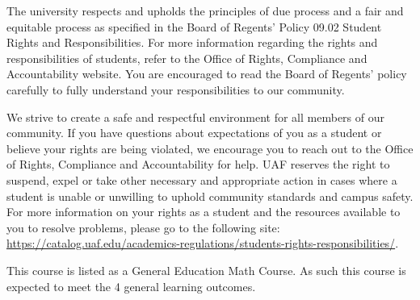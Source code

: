 \documentclass[12pt]{article}
\begin{document}




 The university respects and upholds the principles of due process and a fair and equitable process as specified in the Board of Regents’ Policy 09.02 Student Rights and Responsibilities. For more information regarding the rights and responsibilities of students, refer to the Office of Rights, Compliance and Accountability website. You are encouraged to read the Board of Regents’ policy carefully to fully understand your responsibilities to our community.

We strive to create a safe and respectful environment for all members of our community. If you have questions about expectations of you as a student or believe your rights are being violated, we encourage you to reach out to the  Office of Rights, Compliance and Accountability for help. UAF reserves the right to suspend, expel or take other necessary and appropriate action in cases where a student is unable or unwilling to uphold community standards and campus safety.
For more information on your rights as a student and the resources available to you to resolve problems, please go to the following site:
 \url{https://catalog.uaf.edu/academics-regulations/students-rights-responsibilities/}.

 This course is listed as a General Education Math Course. As such this course is expected to meet the 4 general learning outcomes. 
\end{document}
